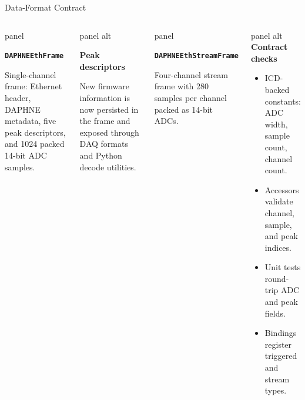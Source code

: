 \documentclass[aspectratio=169,10pt]{beamer}
\begin{document}
\begin{frame}[t]{Data-Format Contract}
\begin{columns}[T,onlytextwidth]
\begin{beamercolorbox}[wd=\linewidth,sep=3.5pt,rounded=true]{panel}
\footnotesize
{\color{noircyan}\bfseries\texttt{DAPHNEEthFrame}\par}
Single-channel frame: Ethernet header, DAPHNE metadata, five peak descriptors, and 1024 packed 14-bit ADC samples.
\end{beamercolorbox}

\vspace{0.8mm}
\begin{beamercolorbox}[wd=\linewidth,sep=3.5pt,rounded=true]{panel alt}
\footnotesize
{\color{noircyan}\bfseries Peak descriptors\par}
New firmware information is now persisted in the frame and exposed through DAQ formats and Python decode utilities.
\end{beamercolorbox}

\vspace{0.8mm}
\begin{beamercolorbox}[wd=\linewidth,sep=3.5pt,rounded=true]{panel}
\footnotesize
{\color{noircyan}\bfseries\texttt{DAPHNEEthStreamFrame}\par}
Four-channel stream frame with 280 samples per channel packed as 14-bit ADCs.
\end{beamercolorbox}

\begin{beamercolorbox}[wd=\linewidth,sep=3.5pt,rounded=true]{panel alt}
\footnotesize
\textcolor{noircyan}{\textbf{Contract checks}}
\vspace{0.3mm}
\begin{itemize}
  \item ICD-backed constants: ADC width, sample count, channel count.
  \item Accessors validate channel, sample, and peak indices.
  \item Unit tests round-trip ADC and peak fields.
  \item Bindings register triggered and stream types.
\end{itemize}
\end{beamercolorbox}
\end{columns}
\end{frame}
\end{document}
